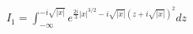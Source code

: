 \documentclass[preview]{standalone}
\begin{document}
\begin{align*}
I_1=\displaystyle \int_{-\infty}^{-i\sqrt{|x|}}e^{\frac{2i}{3}|x|^{3/2}-i\sqrt{|x|}(z+i\sqrt{|x|})^2}dz
\end{align*}
\end{document}
